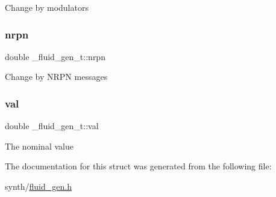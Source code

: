 Change by modulators \mbox{\label{struct__fluid__gen__t_a27422db6e42b16281b11ebe2faf7bc97}} 
\subsubsection{\texorpdfstring{nrpn}{nrpn}}
{\footnotesize\ttfamily double \+\_\+fluid\+\_\+gen\+\_\+t\+::nrpn}

Change by N\+R\+PN messages \mbox{\label{struct__fluid__gen__t_a966264ce25b249592931cc0a4d34fe1d}} 
\subsubsection{\texorpdfstring{val}{val}}
{\footnotesize\ttfamily double \+\_\+fluid\+\_\+gen\+\_\+t\+::val}

The nominal value 

The documentation for this struct was generated from the following file\+:\begin{DoxyCompactItemize}
\item 
synth/\hyperlink{fluid__gen_8h}{fluid\+\_\+gen.\+h}\end{DoxyCompactItemize}
